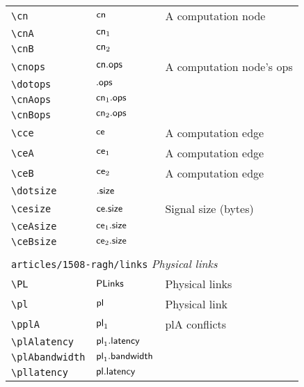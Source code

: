 \begin{longtable}{lll}
 {\color[rgb]{0.5,0.5,0.5}\texttt{\textbackslash cn}} & $\mathsf{cn}$ &  A computation node\\ 
 {\color[rgb]{0.5,0.5,0.5}\texttt{\textbackslash cnA}} & $\mathsf{cn}_1$ & \\ 
 {\color[rgb]{0.5,0.5,0.5}\texttt{\textbackslash cnB}} & $\mathsf{cn}_2$ & \\ 
 {\color[rgb]{0.5,0.5,0.5}\texttt{\textbackslash cnops}} & $\mathsf{cn}\mathsf{.ops}$ &  A computation node's ops\\ 
 {\color[rgb]{0.5,0.5,0.5}\texttt{\textbackslash dotops}} & $\mathsf{.ops}$ & \\ 
 {\color[rgb]{0.5,0.5,0.5}\texttt{\textbackslash cnAops}} & $\mathsf{cn}_1\mathsf{.ops}$ & \\ 
 {\color[rgb]{0.5,0.5,0.5}\texttt{\textbackslash cnBops}} & $\mathsf{cn}_2\mathsf{.ops}$ & \\ 
 {\color[rgb]{0.5,0.5,0.5}\texttt{\textbackslash cce}} & $\mathsf{ce}$ &  A computation edge\\ 
 {\color[rgb]{0.5,0.5,0.5}\texttt{\textbackslash ceA}} & $\mathsf{ce}_1$ &  A computation edge\\ 
 {\color[rgb]{0.5,0.5,0.5}\texttt{\textbackslash ceB}} & $\mathsf{ce}_2$ &  A computation edge\\ 
 {\color[rgb]{0.5,0.5,0.5}\texttt{\textbackslash dotsize}} & $\mathsf{.size}$ & \\ 
 {\color[rgb]{0.5,0.5,0.5}\texttt{\textbackslash cesize}} & $\mathsf{ce}\mathsf{.size}$ &  Signal size (bytes)\\ 
 {\color[rgb]{0.5,0.5,0.5}\texttt{\textbackslash ceAsize}} & $\mathsf{ce}_1\mathsf{.size}$ & \\ 
 {\color[rgb]{0.5,0.5,0.5}\texttt{\textbackslash ceBsize}} & $\mathsf{ce}_2\mathsf{.size}$ & \\ 
  &  & \\ 
 \multicolumn{3}{l}{{\color[rgb]{0.5,0.5,0.5}\texttt{articles/1508-ragh/links}} \emph{Physical links}}\\ 
 \hline
{\color[rgb]{0.5,0.5,0.5}\texttt{\textbackslash PL}} & $\mathsf{PLinks}$ &  Physical links\\ 
 {\color[rgb]{0.5,0.5,0.5}\texttt{\textbackslash pl}} & $\mathsf{pl}$ &  Physical link\\ 
 {\color[rgb]{0.5,0.5,0.5}\texttt{\textbackslash pplA}} & $\mathsf{pl}_1$ &  plA conflicts\\ 
 {\color[rgb]{0.5,0.5,0.5}\texttt{\textbackslash plAlatency}} & $\mathsf{pl}_1\mathsf{.latency}$ & \\ 
 {\color[rgb]{0.5,0.5,0.5}\texttt{\textbackslash plAbandwidth}} & $\mathsf{pl}_1\mathsf{.bandwidth}$ & \\ 
 {\color[rgb]{0.5,0.5,0.5}\texttt{\textbackslash pllatency}} & $\mathsf{pl.latency}$ & \\ 

\end{longtable}
